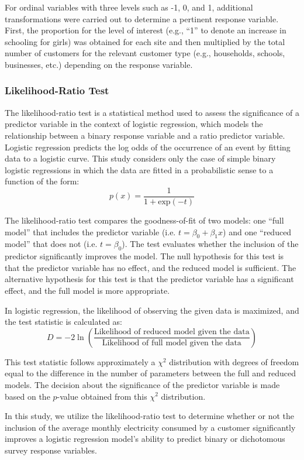 For ordinal variables with three levels such as -1, 0, and 1, additional transformations were carried out to determine a pertinent response variable. First, the proportion for the level of interest (e.g., ``1'' to denote an increase in schooling for girls) was obtained for each site and then multiplied by the total number of customers for the relevant customer type (e.g., households, schools, businesses, etc.) depending on the response variable.

\subsubsection{Likelihood-Ratio Test}
\hfill \break
The likelihood-ratio test is a statistical method used to assess the significance of a predictor variable in the context of logistic regression, which models the relationship between a binary response variable and a ratio predictor variable. Logistic regression predicts the log odds of the occurrence of an event by fitting data to a logistic curve. This study considers only the case of simple binary logistic regressions in which the data are fitted in a probabilistic sense to a function of the form:
\begin{equation}
	p(x)=\frac{1}{1+\mathrm{exp}(-t)}
\end{equation}

The likelihood-ratio test compares the goodness-of-fit of two models: one ``full model'' that includes the predictor variable (i.e. $t=\beta_0+\beta_1x$) and one ``reduced model'' that does not (i.e. $t=\beta_0$). The test evaluates whether the inclusion of the predictor significantly improves the model. The null hypothesis for this test is that the predictor variable has no effect, and the reduced model is sufficient. The alternative hypothesis for this test is that the predictor variable has a significant effect, and the full model is more appropriate.

In logistic regression, the likelihood of observing the given data is maximized, and the test statistic is calculated as:
\begin{equation}
	D = -2 \ln\left(\frac{\text{Likelihood of reduced model given the data}}{\text{Likelihood of full model given the data}}\right)
\end{equation}

This test statistic follows approximately a $\chi^2$ distribution with degrees of freedom equal to the difference in the number of parameters between the full and reduced models. The decision about the significance of the predictor variable is made based on the $p$-value obtained from this $\chi^2$ distribution.

In this study, we utilize the likelihood-ratio test to determine whether or not the inclusion of the average monthly electricity consumed by a customer significantly improves a logistic regression model's ability to predict binary or dichotomous survey response variables.